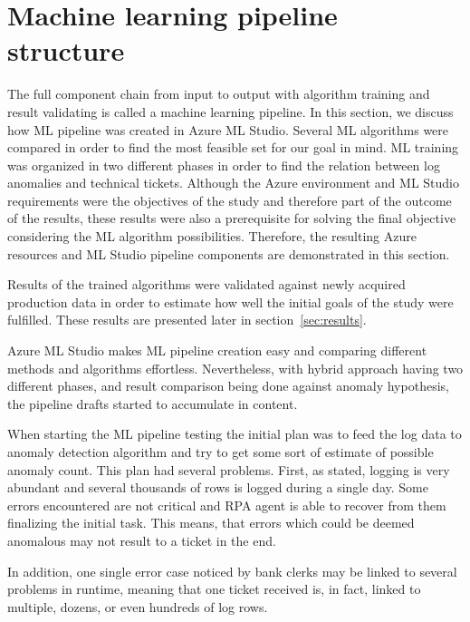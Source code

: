 

\section{Machine learning pipeline structure}\label{sec:ml-pipeline}

The full component chain from input to output
with algorithm training and result validating
is called a machine learning pipeline.
In this section,
we discuss how ML pipeline was created in Azure ML Studio.
Several ML algorithms were compared
in order to find the most feasible set for our goal in mind.
ML training was organized in two different phases
in order to find the relation between
log anomalies and technical tickets.
Although the Azure environment and ML Studio requirements
were the objectives of the study and therefore part of the outcome of the results,
these results were also a prerequisite for solving the final objective
considering the ML algorithm possibilities.
Therefore,
the resulting Azure resources and ML Studio pipeline components
are demonstrated in this section.

Results of the trained algorithms
were validated against newly acquired production data
in order to estimate how well the initial goals of the study
were fulfilled.
These results are presented later in section~\ref{sec:results}.

Azure ML Studio makes ML pipeline creation easy
and comparing different methods and algorithms effortless.
Nevertheless,
with hybrid approach having two different phases,
and result comparison being done against anomaly hypothesis,
the pipeline drafts started to accumulate in content.

When starting the ML pipeline testing
the initial plan was to feed the log data to anomaly detection algorithm
and try to get some sort of estimate of possible anomaly count.
This plan had several problems.
First, as stated, logging is very abundant
and several thousands of rows is logged
during a single day.
Some errors encountered are not critical
and RPA agent is able to recover from them
finalizing the initial task.
This means,
that errors which could be deemed anomalous
may not result to a ticket in the end.

In addition,
one single error case noticed by bank clerks
may be linked to several problems in runtime,
meaning that one ticket received is,
in fact, linked to multiple, dozens, or
even hundreds of log rows.

